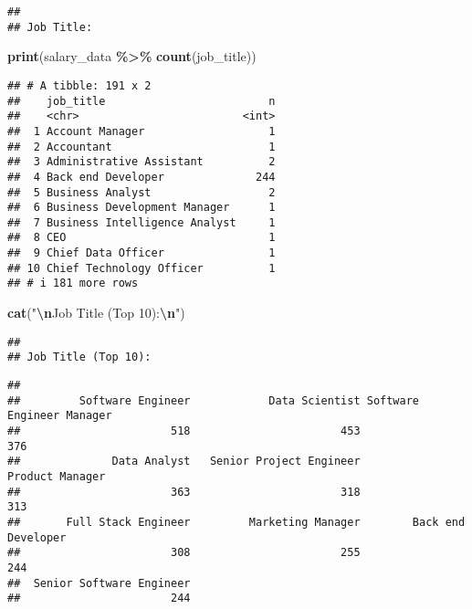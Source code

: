 \documentclass[
]{article}
\newenvironment{Shaded}{\begin{snugshade}}{\end{snugshade}}
\newcommand{\AttributeTok}[1]{\textcolor[rgb]{0.13,0.29,0.53}{#1}}
\newcommand{\ConstantTok}[1]{\textcolor[rgb]{0.56,0.35,0.01}{#1}}
\newcommand{\DecValTok}[1]{\textcolor[rgb]{0.00,0.00,0.81}{#1}}
\newcommand{\FunctionTok}[1]{\textcolor[rgb]{0.13,0.29,0.53}{\textbf{#1}}}
\newcommand{\NormalTok}[1]{#1}
\newcommand{\SpecialCharTok}[1]{\textcolor[rgb]{0.81,0.36,0.00}{\textbf{#1}}}
\newcommand{\StringTok}[1]{\textcolor[rgb]{0.31,0.60,0.02}{#1}}
\begin{document}
\begin{verbatim}
## 
## Job Title:
\end{verbatim}

\begin{Shaded}
\begin{Highlighting}[]
\FunctionTok{print}\NormalTok{(salary\_data }\SpecialCharTok{\%\textgreater{}\%}
  \FunctionTok{count}\NormalTok{(job\_title))}
\end{Highlighting}
\end{Shaded}

\begin{verbatim}
## # A tibble: 191 x 2
##    job_title                         n
##    <chr>                         <int>
##  1 Account Manager                   1
##  2 Accountant                        1
##  3 Administrative Assistant          2
##  4 Back end Developer              244
##  5 Business Analyst                  2
##  6 Business Development Manager      1
##  7 Business Intelligence Analyst     1
##  8 CEO                               1
##  9 Chief Data Officer                1
## 10 Chief Technology Officer          1
## # i 181 more rows
\end{verbatim}

\begin{Shaded}
\begin{Highlighting}[]
\FunctionTok{cat}\NormalTok{(}\StringTok{"}\SpecialCharTok{\textbackslash{}n}\StringTok{Job Title (Top 10):}\SpecialCharTok{\textbackslash{}n}\StringTok{"}\NormalTok{)}
\end{Highlighting}
\end{Shaded}

\begin{verbatim}
## 
## Job Title (Top 10):
\end{verbatim}

\begin{Shaded}
\end{Shaded}

\begin{verbatim}
## 
##         Software Engineer            Data Scientist Software Engineer Manager 
##                       518                       453                       376 
##              Data Analyst   Senior Project Engineer           Product Manager 
##                       363                       318                       313 
##       Full Stack Engineer         Marketing Manager        Back end Developer 
##                       308                       255                       244 
##  Senior Software Engineer 
##                       244
\end{verbatim}
\end{document}
